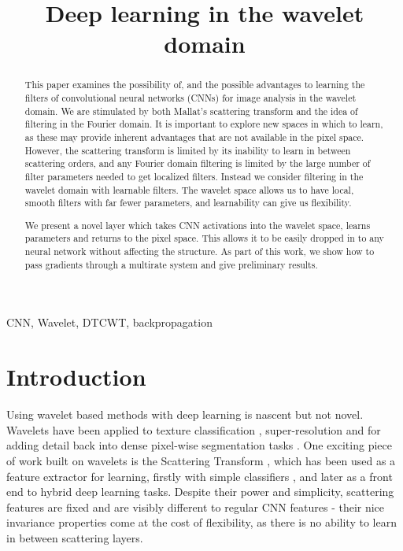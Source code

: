 \documentclass[9pt]{article}
\title{Deep learning in the wavelet domain}
\begin{document}
\maketitle

\begin{abstract}
This paper examines the possibility of, and the possible advantages to learning the
filters of convolutional neural networks (CNNs) for image analysis in the wavelet domain.  
We are stimulated by both Mallat's scattering transform \cite{mallat_group_2012} and the idea of
filtering in the Fourier domain. It is important to explore new spaces in which to learn, as these
may provide inherent advantages that are not available in the pixel space. However, the scattering
transform is limited by its inability to learn in between scattering orders, and any Fourier domain
filtering is limited by the large number of filter parameters needed to get localized filters.
Instead we consider filtering in the wavelet domain with learnable filters. The wavelet space allows
us to have local, smooth filters with far fewer parameters, and learnability can give us
flexibility. 

We present a novel layer which takes CNN activations into the wavelet space, learns
parameters and returns to the pixel space. This allows it to be easily dropped in to any neural
network without affecting the structure. As part of this work, we show how to pass gradients through 
a multirate system and give preliminary results.

\end{abstract}
\begin{keywords}
CNN, Wavelet, DTCWT, backpropagation
\end{keywords}
\section{Introduction}\label{sec:intro}
Using wavelet based methods with deep learning is nascent but not novel. Wavelets have been applied 
to texture classification \cite{fujieda_wavelet_2017, sifre_combined_2012}, super-resolution
\cite{guo_deep_2017} and for adding detail back into dense pixel-wise segmentation tasks
\cite{ma_detailed_2018}. One exciting piece of work built on wavelets is the Scattering Transform
\cite{mallat_group_2012}, which has been used as a feature extractor for learning, firstly with
simple classifiers \cite{bruna_invariant_2013, singh_scatternet_2017}, and later as a front end to
hybrid deep learning tasks\cite{oyallon_scaling_2017, singh_scatternet_2018}. Despite their power
and simplicity, scattering features are fixed and are visibly different to regular CNN features
\cite{cotter_visualizing_2017} - their nice invariance properties come at the cost of flexibility,
as there is no ability to learn in between scattering layers. 
\end{document}
